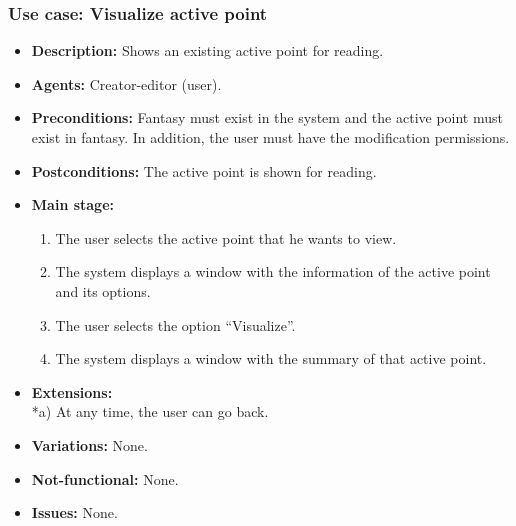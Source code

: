 \subsubsection{Use case: Visualize active point}
\begin{itemize}
	\item \textbf{Description:} Shows an existing active point for reading.
	\item \textbf{Agents:} Creator-editor (user).
	\item \textbf{Preconditions:} Fantasy must exist in the system and the active point must exist in fantasy. In addition, the user must have the modification permissions.
	\item \textbf{Postconditions:} The active point is shown for reading.
	\item \textbf{Main stage:}
	\begin{enumerate}
		\item The user selects the active point that he wants to view.
		\item The system displays a window with the information of the active point and its options.
		\item The user selects the option ``Visualize''.
		\item The system displays a window with the summary of that active point.
	\end{enumerate}
	\item \textbf{Extensions:} \\ *a) At any time, the user can go back.
	\item \textbf{Variations:} None.
	\item \textbf{Not-functional:} None.
	\item \textbf{Issues:} None.
\end{itemize}

